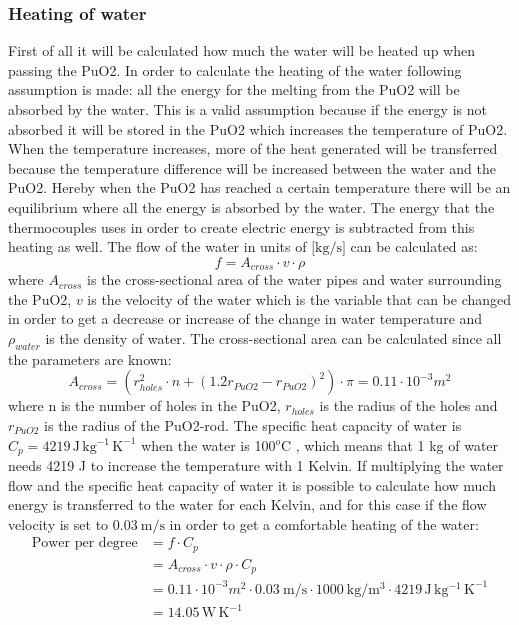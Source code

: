 \subsubsection{Heating of water}
First of all it will be calculated how much the water will be heated up when passing the PuO2. In order to calculate the heating of the water following assumption is made: all the energy for the melting from the PuO2 will be absorbed by the water. This is a valid assumption because if the energy is not absorbed it will be stored in the PuO2 which increases the temperature of PuO2. When the temperature increases, more of the heat generated will be transferred because the temperature difference will be increased between the water and the PuO2. Hereby when the PuO2 has reached a certain temperature there will be an equilibrium where all the energy is absorbed by the water. The energy that the thermocouples uses in order to create electric energy is subtracted from this heating as well.
The flow of the water in units of $\text{[kg/s]}$ can be calculated as: 
\begin{equation}
f = A_{cross} \cdot v \cdot \rho
\end{equation}
where $A_{cross}$ is the cross-sectional area of the water pipes and water surrounding the PuO2, $v$ is the velocity of the water which is the variable that can be changed in order to get a decrease or increase of the change in water temperature and $\rho_{water}$ is the density of water. The cross-sectional area can be calculated since all the parameters are known: 
\begin{equation}
A_{cross} = \left(r_{holes}^2 \cdot n + \left(1.2r_{PuO2}-r_{PuO2}\right) ^2 \right) \cdot \pi = 0.11 \cdot 10^{-3} m^2
\end{equation}
where n is the number of holes in the PuO2, $r_{holes}$ is the radius of the holes and $r_{PuO2}$ is the radius of the PuO2-rod.  The specific heat capacity of water is $C_p = 4219 \, \mathrm{J \, kg^{-1} \, K^{-1}}$ when the water is 100$^o$C \cite{website:water_dens}, which means that 1 kg of water needs 4219 J to increase the temperature with 1 Kelvin. If multiplying the water flow and the specific heat capacity of water it is possible to calculate how much energy is transferred to the water for each Kelvin, and for this case if the flow velocity is set to $\SI{0.03}{\metre\per\second}$ in order to get a comfortable heating of the water: 
\begin{equation}\label{eq:waterheating}
\begin{aligned}
\text{Power per degree} & ={} f \cdot C_p \\
& = A_{cross} \cdot v \cdot \rho \cdot C_p \\
& = 0.11\cdot 10^{-3} m^2 \cdot \SI{0.03}{\metre\per\second} \cdot \SI{1000}{\kilo\gram\per\cubic\metre} \cdot 4219 \, \mathrm{J \, kg^{-1} \, K^{-1}} \\
& = 14.05 \, \mathrm{W \, K^{-1}}
\end{aligned}
\end{equation}
